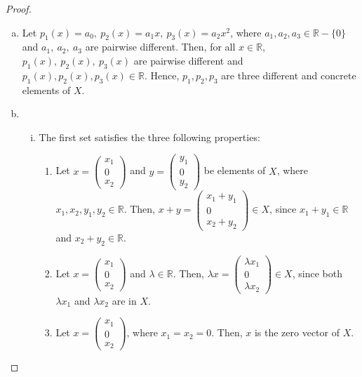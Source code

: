 \begin{proof}
\begin{enumerate}[(a)]
    \item Let $p_1(x) = a_0,\:p_2(x) = a_1x,\:p_3(x) = a_2x^2$, where $a_1, a_2, a_3\in\mathbb{R}-\{0\}$ and $a_1,\:a_2,\:a_3$ are pairwise different. Then, for all $x\in\mathbb{R}$, $p_1(x),\: p_2(x),\: p_3(x)$ are pairwise different and $p_1(x), p_2(x), p_3(x)\in\mathbb{R}$. Hence, $p_1, p_2, p_3$ are three different and concrete elements of $X$.
    
    \item\begin{enumerate}[(i)]
        \item The first set satisfies the three following properties:
        \begin{enumerate}[(1)]
            \item Let $x = \begin{pmatrix}x_1\\0\\x_2\end{pmatrix}$ and $y = \begin{pmatrix}y_1\\0\\y_2\end{pmatrix}$ be elements of $X$, where $x_1, x_2, y_1, y_2\in\mathbb{R}$. Then, $x+y=\begin{pmatrix}x_1+y_1\\0\\x_2+y_2\end{pmatrix}\in X$, since $x_1 + y_1\in\mathbb{R}$ and $x_2 + y_2\in\mathbb{R}$.
            \item Let $x = \begin{pmatrix}x_1\\0\\x_2\end{pmatrix}$ and $\lambda\in\mathbb{R}$. Then, $\lambda x = \begin{pmatrix}\lambda x_1\\0\\\lambda x_2\end{pmatrix}\in X$, since both $\lambda x_1$ and $\lambda x_2$ are in $X$.
            \item Let $x = \begin{pmatrix}x_1\\0\\x_2\end{pmatrix}$, where $x_1 = x_2 = 0$. Then, $x$ is the zero vector of $X$.
        \end{enumerate}

\end{enumerate}
\end{enumerate}
\end{proof}
